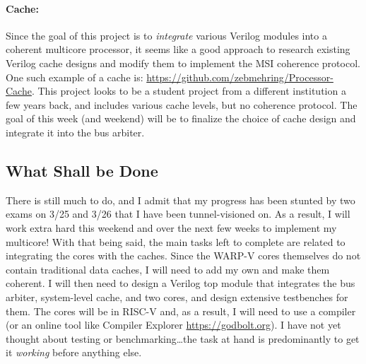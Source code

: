 \documentclass[10pt]{article}
\begin{document}
\paragraph{Cache:} Since the goal of this project is to \textit{integrate} various Verilog modules into a coherent multicore processor, it seems like a good approach to research existing Verilog cache designs and modify them to implement the MSI coherence protocol. One such example of a cache is: \url{https://github.com/zebmehring/Processor-Cache}. This project looks to be a student project from a different institution a few years back, and includes various cache levels, but no coherence protocol. The goal of this week (and weekend) will be to finalize the choice of cache design and integrate it into the bus arbiter. 

\subsection*{What Shall be Done}
There is still much to do, and I admit that my progress has been stunted by two exams on 3/25 and 3/26 that I have been tunnel-visioned on. As a result, I will work extra hard this weekend and over the next few weeks to implement my multicore! With that being said, the main tasks left to complete are related to integrating the cores with the caches. Since the WARP-V cores themselves do not contain traditional data caches, I will need to add my own and make them coherent. I will then need to design a Verilog top module that integrates the bus arbiter, system-level cache, and two cores, and design extensive testbenches for them. The cores will be in RISC-V and, as a result, I will need to use a compiler (or an online tool like Compiler Explorer \url{https://godbolt.org}). I have not yet thought about testing or benchmarking\dots the task at hand is predominantly to get it \textit{working} before anything else. 
\end{document}
